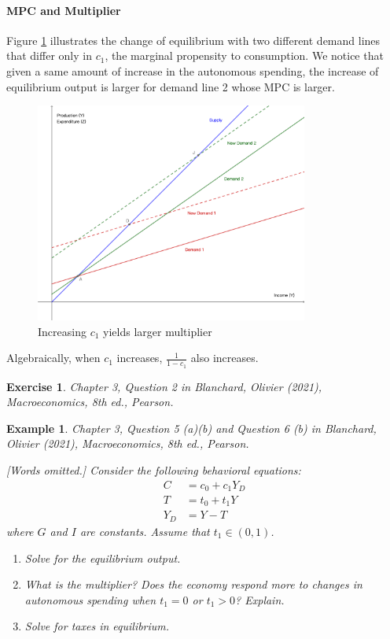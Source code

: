 \documentclass[12pt]{article}
\newtheorem{example}{Example}
\newtheorem{exercise}{Exercise}
\begin{document}
\paragraph{MPC and Multiplier}
Figure \ref{fig:key_cross_v3} illustrates the change of equilibrium with two different demand lines that differ only in $c_1$, the marginal propensity to consumption. We notice that given a same amount of increase in the autonomous spending, the increase of equilibrium output is larger for demand line 2 whose MPC is larger.

\begin{figure}[htp]
    \centering
    \includegraphics[width=0.8\textwidth]{keynesian_cross_c1change.png}
    \caption{Increasing $c_1$ yields larger multiplier}
    \label{fig:key_cross_v3}
\end{figure}

Algebraically, when $c_1$ increases, $\frac{1}{1-c_1}$ also increases.

\begin{exercise}
    Chapter 3, Question 2 in Blanchard, Olivier (2021), \textit{Macroeconomics}, 8th ed., Pearson.
\end{exercise}

\begin{example}
    Chapter 3, Question 5 (a)(b) and Question 6 (b) in Blanchard, Olivier (2021), \textit{Macroeconomics}, 8th ed., Pearson.

    [Words omitted.] Consider the following behavioral equations:
    \begin{align*}
        C &= c_0 + c_1Y_D\\
        T &= t_0 + t_1Y\\
        Y_D &= Y-T
    \end{align*}
    where $G$ and $I$ are constants. Assume that $t_1\in(0,1)$.
    \begin{enumerate}[label=\alph*.]
        \item Solve for the equilibrium output.
        \item What is the multiplier? Does the economy respond more to changes in autonomous spending when $t_1=0$ or $t_1>0$? Explain.
        \item Solve for taxes in equilibrium.
    \end{enumerate}
\end{example}
\end{document}

